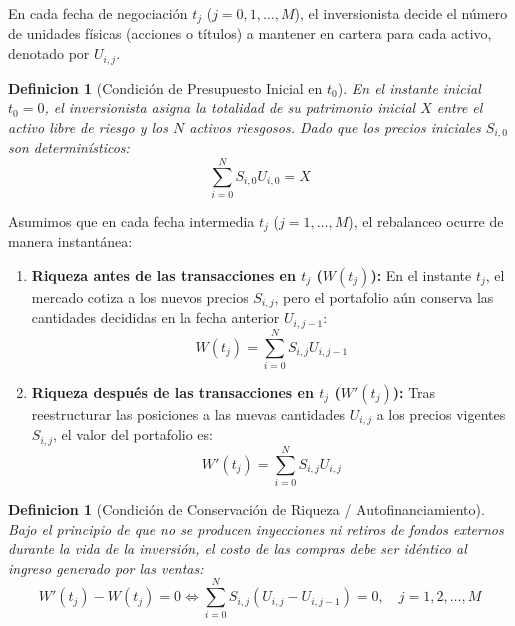 \documentclass[11pt,a4paper]{report}
\newtheorem{definition}[theorem]{Definicion}
\numberwithin{equation}{chapter}
\begin{document}
En cada fecha de negociación $t_j$ ($j=0, 1, \dots, M$), el inversionista decide el número de unidades físicas (acciones o títulos) a mantener en cartera para cada activo, denotado por $U_{i,j}$.

\begin{definition}[Condición de Presupuesto Inicial en $t_0$]
En el instante inicial $t_0 = 0$, el inversionista asigna la totalidad de su patrimonio inicial $X$ entre el activo libre de riesgo y los $N$ activos riesgosos. Dado que los precios iniciales $S_{i,0}$ son determinísticos:
\begin{equation}
    \sum_{i=0}^N S_{i,0} U_{i,0} = X \label{eq:presupuesto_inicial_nominal}
\end{equation}
\end{definition}

Asumimos que en cada fecha intermedia $t_j$ ($j=1, \dots, M$), el rebalanceo ocurre de manera instantánea:
\begin{enumerate}
    \item \textbf{Riqueza antes de las transacciones en $t_j$ ($W(t_j)$):} En el instante $t_j$, el mercado cotiza a los nuevos precios $S_{i,j}$, pero el portafolio aún conserva las cantidades decididas en la fecha anterior $U_{i,j-1}$:
    \begin{equation}
        W(t_j) = \sum_{i=0}^N S_{i,j} U_{i,j-1} \label{eq:riqueza_previa}
    \end{equation}
    \item \textbf{Riqueza después de las transacciones en $t_j$ ($W'(t_j)$):} Tras reestructurar las posiciones a las nuevas cantidades $U_{i,j}$ a los precios vigentes $S_{i,j}$, el valor del portafolio es:
    \begin{equation}
        W'(t_j) = \sum_{i=0}^N S_{i,j} U_{i,j} \label{eq:riqueza_posterior}
    \end{equation}
\end{enumerate}

\begin{definition}[Condición de Conservación de Riqueza / Autofinanciamiento]
Bajo el principio de que no se producen inyecciones ni retiros de fondos externos durante la vida de la inversión, el costo de las compras debe ser idéntico al ingreso generado por las ventas:
\begin{equation}
    W'(t_j) - W(t_j) = 0 \iff \sum_{i=0}^N S_{i,j} (U_{i,j} - U_{i,j-1}) = 0, \quad j = 1, 2, \dots, M \label{eq:conservacion_exacta}
\end{equation}
\end{definition}
\end{document}
